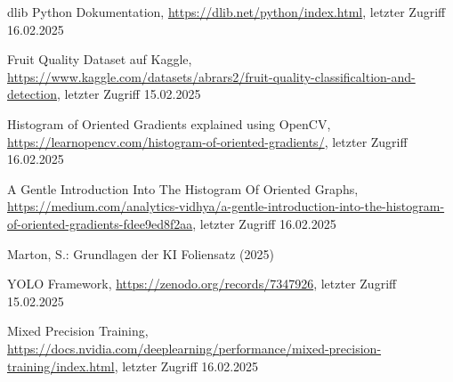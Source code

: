 \documentclass[runningheads]{llncs}
\begin{document}
\begin{thebibliography}{8}
dlib Python Dokumentation, \url{https://dlib.net/python/index.html}, letzter Zugriff 16.02.2025

Fruit Quality Dataset auf Kaggle, \url{https://www.kaggle.com/datasets/abrars2/fruit-quality-classificaltion-and-detection}, letzter Zugriff 15.02.2025

Histogram of Oriented Gradients explained using OpenCV, \url{https://learnopencv.com/histogram-of-oriented-gradients/}, letzter Zugriff 16.02.2025

A Gentle Introduction Into The Histogram Of Oriented Graphs, \url{https://medium.com/analytics-vidhya/a-gentle-introduction-into-the-histogram-of-oriented-gradients-fdee9ed8f2aa}, letzter Zugriff 16.02.2025

Marton, S.: Grundlagen der KI Foliensatz (2025)

YOLO Framework, \url{https://zenodo.org/records/7347926}, letzter Zugriff 15.02.2025

Mixed Precision Training, \url{https://docs.nvidia.com/deeplearning/performance/mixed-precision-training/index.html}, letzter Zugriff 16.02.2025




\end{thebibliography}
\end{document}
